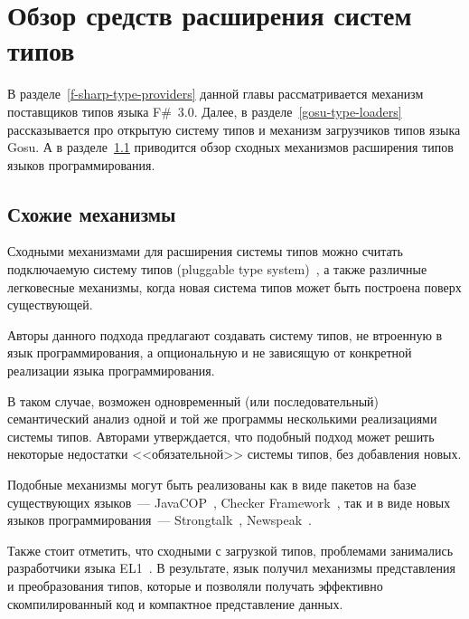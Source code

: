 \section{Обзор средств расширения систем типов}
В разделе~\ref{f-sharp-type-providers} данной главы рассматривается механизм поставщиков типов языка F\#~3.0. Далее, в разделе~\ref{gosu-type-loaders} рассказывается про открытую систему типов и механизм загрузчиков типов языка Gosu. А в разделе~\ref{similar-mechanisms} приводится обзор сходных механизмов расширения типов языков программирования.




\subsection{Схожие механизмы}\label{similar-mechanisms}
Сходными механизмами для расширения системы типов можно считать подключаемую систему типов (pluggable type system)~\cite{bracha}, а также различные легковесные механизмы, когда новая система типов может быть построена поверх существующей.

Авторы данного подхода предлагают создавать систему типов, не втроенную в язык программирования, а опциональную и не зависящую от конкретной реализации языка программирования.

В таком случае, возможен одновременный (или последовательный) семантический анализ одной и той же программы несколькими реализациями системы типов. Авторами утверждается, что подобный подход может решить некоторые недостатки <<обязательной>> системы типов, без добавления новых.

Подобные механизмы могут быть реализованы как в виде пакетов на базе существующих языков~--- JavaCOP~\cite{javacop2010}, Checker Framework~\cite{checkerframework2008},
так и в виде новых языков программирования~--- Strongtalk~\cite{strongtalk1993}, Newspeak~\cite{newspeak2008}.

Также стоит отметить, что сходными с загрузкой типов, проблемами занимались разработчики языка EL1~\cite{el1}.
В результате, язык получил механизмы представления и преобразования типов, которые и позволяли получать эффективно скомпилированный код и компактное представление данных.